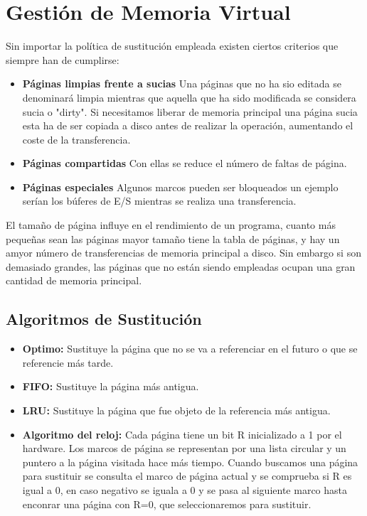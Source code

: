 \section*{Gestión de Memoria Virtual}
Sin importar la política de sustitución empleada existen ciertos criterios que siempre han de cumplirse:

\begin{itemize}
	\item\textbf{Páginas limpias frente a sucias} Una páginas que no ha sio editada se denominará limpia mientras que aquella que ha sido modificada se considera sucia o "dirty". Si necesitamos liberar de memoria principal una página sucia esta ha de ser copiada a disco antes de realizar la operación, aumentando el coste de la transferencia.
	\item\textbf{Páginas compartidas} Con ellas se reduce el número de faltas de página.
	\item\textbf{Páginas especiales} Algunos marcos pueden ser bloqueados un ejemplo serían los búferes de E/S mientras se realiza una transferencia.
\end{itemize}

El tamaño de página influye en el rendimiento de un programa, cuanto más pequeñas sean las páginas mayor tamaño tiene la tabla de páginas, y hay un amyor número de transferencias de memoria principal a disco. Sin embargo si son demasiado grandes, las páginas que no están siendo empleadas ocupan una gran cantidad de memoria principal.


\subsection*{Algoritmos de Sustitución}
\begin{itemize}
	\item\textbf{Optimo:} Sustituye la página que no se va a referenciar en el futuro o que se referencie más tarde.
	\item\textbf{FIFO:} Sustituye la página más antigua.
	\item\textbf{LRU:} Sustituye la página que fue objeto de la referencia más antigua.
	\item\textbf{Algoritmo del reloj:} Cada página tiene un bit R inicializado a 1 por el hardware. Los marcos de página se representan por una lista circular y un puntero a la página visitada hace más tiempo. Cuando buscamos una página para sustituir se consulta el marco de página actual y se comprueba si R es igual a 0, en caso negativo se iguala a 0 y se pasa al siguiente marco hasta enconrar una página con R=0, que seleccionaremos para sustituir.
\end{itemize}

